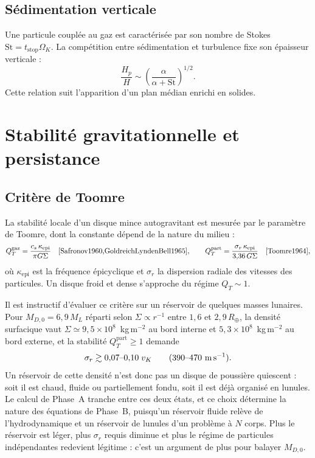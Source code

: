 \documentclass[11pt,a4paper,openany]{report}
\newcommand{\Rt}{R_{\oplus}}
\begin{document}
\subsection{Sédimentation verticale}

Une particule couplée au gaz est caractérisée par son nombre de Stokes
$\mathrm{St}=t_{\mathrm{stop}}\Omega_K$. La compétition entre sédimentation et turbulence fixe
son épaisseur verticale :
\begin{equation}
\frac{H_p}{H}\sim\left(\frac{\alpha}{\alpha+\mathrm{St}}\right)^{1/2}.
\label{eq:Hp}
\end{equation}
Cette relation suit l'apparition d'un plan médian enrichi en solides.


\section{Stabilité gravitationnelle et persistance}
\subsection{Critère de Toomre}

La stabilité locale d'un disque mince autogravitant est mesurée par le paramètre de Toomre,
dont la constante dépend de la nature du milieu :
\begin{equation}
Q_T^{\mathrm{gaz}}=\frac{c_s\,\kappa_{\mathrm{epi}}}{\pi G\Sigma}
\quad\text{\cite{Safronov1960,GoldreichLyndenBell1965}},
\qquad
Q_T^{\mathrm{part}}=\frac{\sigma_r\,\kappa_{\mathrm{epi}}}{3{,}36\,G\Sigma}
\quad\text{\cite{Toomre1964}},
\label{eq:Toomre}
\end{equation}
où $\kappa_{\mathrm{epi}}$ est la fréquence épicyclique et $\sigma_r$ la dispersion radiale des
vitesses des particules. Un disque froid et dense s'approche du régime $Q_T\sim1$.

Il est instructif d'évaluer ce critère sur un réservoir de quelques masses lunaires. Pour
$M_{D,0}=6{,}9\,M_L$ réparti selon $\Sigma\propto r^{-1}$ entre $1{,}6$ et $2{,}9\,\Rt$, la densité
surfacique vaut $\Sigma\simeq9{,}5\times10^{8}$~kg\,m$^{-2}$ au bord interne et
$5{,}3\times10^{8}$~kg\,m$^{-2}$ au bord externe, et la stabilité $Q_T^{\mathrm{part}}\ge1$ demande
\begin{equation}
\sigma_r\gtrsim0{,}07\text{--}0{,}10\;v_K\qquad(390\text{--}470\ \text{m\,s}^{-1}).
\label{eq:sigmar-reservoir}
\end{equation}
Un réservoir de cette densité n'est donc pas un disque de poussière quiescent : soit il est chaud,
fluide ou partiellement fondu, soit il est déjà organisé en lunules. Le calcul de Phase~A tranche
entre ces deux états, et ce choix détermine la nature des équations de Phase~B, puisqu'un réservoir
fluide relève de l'hydrodynamique et un réservoir de lunules d'un problème à $N$ corps. Plus le
réservoir est léger, plus $\sigma_r$ requis diminue et plus le régime de particules indépendantes
redevient légitime : c'est un argument de plus pour balayer $M_{D,0}$.
\end{document}
